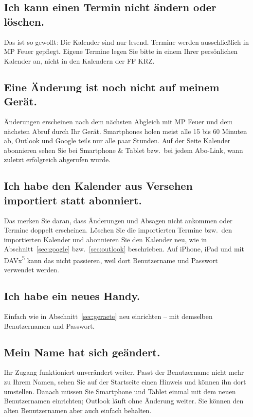 \documentclass[a4paper,fontsize=10pt]{scrartcl}
\newcommand{\menue}[1]{\textsf{#1}}
\begin{document}
\subsection*{Ich kann einen Termin nicht ändern oder löschen.}
Das ist so gewollt: Die Kalender sind nur lesend. Termine werden
ausschließlich in MP Feuer gepflegt. Eigene Termine legen Sie bitte in einem
Ihrer persönlichen Kalender an, nicht in den Kalendern der FF KRZ.

\subsection*{Eine Änderung ist noch nicht auf meinem Gerät.}
Änderungen erscheinen nach dem nächsten Abgleich mit MP Feuer und dem
nächsten Abruf durch Ihr Gerät. Smartphones holen meist alle 15 bis 60
Minuten ab, Outlook und Google teils nur alle paar Stunden. Auf der Seite
\menue{Kalender abonnieren} sehen Sie bei \menue{Smartphone \& Tablet} bzw.\
bei jedem Abo-Link, wann zuletzt erfolgreich abgerufen wurde.

\subsection*{Ich habe den Kalender aus Versehen importiert statt abonniert.}
Das merken Sie daran, dass Änderungen und Absagen nicht ankommen oder Termine
doppelt erscheinen. Löschen Sie die importierten Termine bzw.\ den importierten
Kalender und abonnieren Sie den Kalender neu, wie in
Abschnitt~\ref{sec:google} bzw.\ \ref{sec:outlook} beschrieben. Auf iPhone,
iPad und mit DAVx\textsuperscript{5} kann das nicht passieren, weil dort
Benutzername und Passwort verwendet werden.

\subsection*{Ich habe ein neues Handy.}
Einfach wie in Abschnitt~\ref{sec:geraete} neu einrichten -- mit demselben
Benutzernamen und Passwort.

\subsection*{Mein Name hat sich geändert.}
Ihr Zugang funktioniert unverändert weiter. Passt der Benutzername nicht mehr
zu Ihrem Namen, sehen Sie auf der Startseite einen Hinweis und können ihn
dort umstellen. Danach müssen Sie Smartphone und Tablet einmal mit dem neuen
Benutzernamen einrichten; Outlook läuft ohne Änderung weiter. Sie können den
alten Benutzernamen aber auch einfach behalten.
\end{document}
